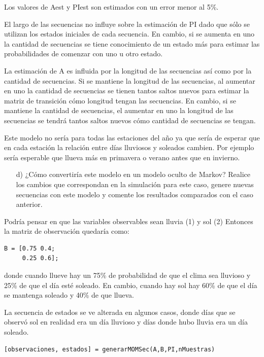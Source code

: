 \documentclass[11pt,a4paper,final]{article}
\begin{document}
Los valores de Aest y PIest son estimados con un error menor al 5\%.

El largo de las secuencias no influye sobre la estimación de PI dado que sólo se utilizan los estados iniciales de cada secuencia. En cambio, si se aumenta en uno la cantidad de secuencias se tiene conocimiento de un estado más para estimar las probabilidades de comenzar con uno u otro estado.

La estimación de A es influida por la longitud de las secuencias así como por la cantidad de secuencias. Si se mantiene la longitud de las secuencias, al aumentar en uno la cantidad de secuencias se tienen tantos saltos nuevos para estimar la matriz de transición cómo longitud tengan las secuencias. En cambio, si se mantiene la cantidad de secuencias, el aumentar en uno la longitud de las secuencias se tendrá tantos saltos nuevos cómo cantidad de secuencias se tengan.

Este modelo no sería para todas las estaciones del año ya que sería de esperar que en cada estación la relación entre días lluviosos y soleados cambien. Por ejemplo sería esperable que llueva más en primavera o verano antes que en invierno.

\begin{itemize}
   \item[d)] ¿Cómo convertiría este modelo en un modelo oculto de Markov? Realice los cambios que correspondan en la simulación para este caso, genere nuevas secuencias con este modelo y comente los resultados comparados con el caso anterior.
\end{itemize}

Podría pensar en que las variables observables sean lluvia (1) y sol (2) Entonces la matriz de observación quedaría como:

\begin{verbatim}
B = [0.75 0.4;
     0.25 0.6];
\end{verbatim}

donde cuando llueve hay un 75\% de probabilidad de que el clima sea lluvioso y 25\% de que el día esté soleado. En cambio, cuando hay sol hay 60\% de que el día se mantenga soleado y 40\% de que llueva.


La secuencia de estados se ve alterada en algunos casos, donde días que se observó sol en realidad era un día lluvioso y días donde hubo lluvia era un día soleado.

\begin{verbatim}
[observaciones, estados] = generarMOMSec(A,B,PI,nMuestras)
\end{verbatim}
\end{document}
